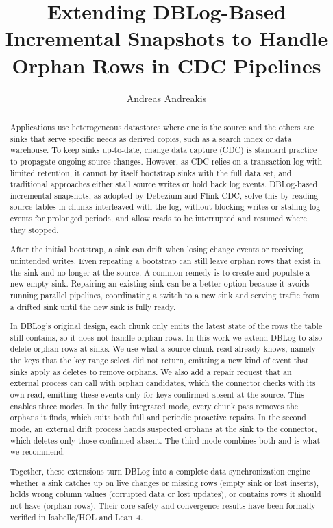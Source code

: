 \documentclass[sigconf,nonacm,10pt]{acmart}
\title{Extending DBLog-Based Incremental Snapshots to Handle Orphan Rows in
CDC Pipelines}
\author{Andreas Andreakis}
\begin{document}
\begin{abstract}
Applications use heterogeneous datastores where one is the source and the others are sinks that serve specific needs as derived copies, such as a search index or data warehouse. To keep sinks up-to-date, change data capture (CDC) is standard practice to propagate ongoing source changes. However, as CDC relies on a transaction log with limited retention, it cannot by itself bootstrap sinks with the full data set, and traditional approaches either stall source writes or hold back log events. DBLog-based incremental snapshots, as adopted by Debezium and Flink CDC, solve this by reading source tables in chunks interleaved with the log, without blocking writes or stalling log events for prolonged periods, and allow reads to be interrupted and resumed where they stopped.

After the initial bootstrap, a sink can drift when losing change events or receiving unintended writes. Even repeating a bootstrap can still leave orphan rows that exist in the sink and no longer at the source. A common remedy is to create and populate a new empty sink. Repairing an existing sink can be a better option because it avoids running parallel pipelines, coordinating a switch to a new sink and serving traffic from a drifted sink until the new sink is fully ready.

In DBLog's original design, each chunk only emits the latest state of the rows the table still contains, so it does not handle orphan rows. In this work we extend DBLog to also delete orphan rows at sinks. We use what a source chunk read already knows, namely the keys that the key range select did not return, emitting a new kind of event that sinks apply as deletes to remove orphans. We also add a repair request that an external process can call with orphan candidates, which the connector checks with its own read, emitting these events only for keys confirmed absent at the source. This enables three modes. In the fully integrated mode, every chunk pass removes the orphans it finds, which suits both full and periodic proactive repairs. In the second mode, an external drift process hands suspected orphans at the sink to the connector, which deletes only those confirmed absent. The third mode combines both and is what we recommend.

Together, these extensions turn DBLog into a complete data synchronization engine whether a sink catches up on live changes or missing rows (empty sink or lost inserts), holds wrong column values (corrupted data or lost updates), or contains rows it should not have (orphan rows). Their core safety and convergence results have been formally verified in Isabelle/HOL and Lean~4.
\end{abstract}
\end{document}
